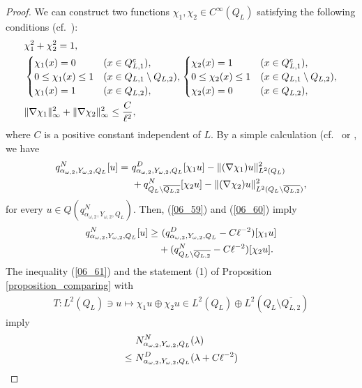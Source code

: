 \documentclass[12pt,a4paper]{article}
\begin{document}
\begin{proof}
We can construct two functions $\chi_1,\chi_2\in C^\infty(Q_L)$
satisfying the following conditions
(cf.\ \cite[Proposition 8.1]{Do-Iw-Mi}):
\begin{align}
& \chi_1^2+\chi_2^2=1,
\label{06_59}
\\
&
\begin{cases}
\chi_1(x) =0 & (x\in Q_{L,1}^c) ,\\
0\leq \chi_1(x)\leq 1 & (x\in Q_{L,1}\setminus Q_{L,2}),\\
\chi_1(x)=1 & (x\in Q_{L,2}),
\end{cases}
\begin{cases}
\chi_2 (x)=1 & (x\in Q_{L,1}^c),\\
0\leq \chi_2(x)\leq 1 & (x\in Q_{L,1}\setminus Q_{L,2}),\\
\chi_2(x) =0 & (x\in Q_{L,2}),
\end{cases}
\notag
\\
&
\|\nabla \chi_1\|_\infty^2
+\|\nabla \chi_2\|_\infty^2
\leq \frac{C}{\ell^2},
\label{06_60}
\end{align}
where $C$ is a positive constant independent of $L$.
By a simple calculation (cf.\ \cite[Theorem 3.2]{Cy-Fr-Ki-Si}
or \cite[(6.14)]{Do-Iw-Mi},
we have
\begin{align*}
q^N_{\alpha_{\omega,2},Y_{\omega,2},Q_L}[u]
=&\ 
q^D_{\alpha_{\omega,2},Y_{\omega,2},Q_L}[\chi_1 u]
-\|(\nabla \chi_1)u\|_{L^2(Q_L)}^2\notag\\
&\ 
+
q^N_{Q_L\setminus \overline{Q_{L,2}}}[\chi_2 u]
-\|(\nabla \chi_2)u\|_{L^2(Q_L\setminus \overline{Q_{L,2}})}^2,
\end{align*}
for every $u\in Q(q^N_{\alpha_{\omega,2},Y_{\omega,2},Q_L})$.
Then, (\ref{06_59}) and (\ref{06_60}) imply
\begin{align}
 q^N_{\alpha_{\omega,2},Y_{\omega,2},Q_L}[u]
\geq&\  (
q^D_{\alpha_{\omega,2},Y_{\omega,2},Q_L}
-C\ell^{-2})[\chi_1 u]\notag\\
&+
(q^N_{Q_L\setminus \overline{Q_{L,2}}}
-C\ell^{-2})[\chi_2 u].
\label{06_61}
\end{align}
The inequality (\ref{06_61}) and 
the statement (1) of Proposition \ref{proposition_comparing} with
\begin{align*}
 T:L^2(Q_L)\ni u\mapsto
\chi_1 u\oplus \chi_2 u
\in L^2(Q_L)\oplus
L^2(Q_L\setminus \overline{Q_{L,2}})
\end{align*}
imply
\begin{align}
&\  N^N_{\alpha_{\omega,2},Y_{\omega,2},Q_L}(\lambda)\notag\\
\leq &\ 
 N^D_{\alpha_{\omega,2},Y_{\omega,2},Q_L}(\lambda+C\ell^{-2})

\end{align}
\end{proof}
\end{document}
